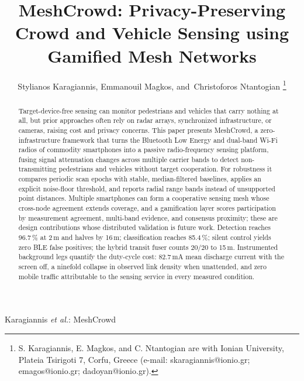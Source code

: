 \documentclass[journal,10pt]{IEEEtran}
\begin{document}
\title{MeshCrowd: Privacy-Preserving Crowd and Vehicle Sensing using Gamified Mesh Networks}

\author{Stylianos Karagiannis,
        Emmanouil Magkos,
        and~Christoforos Ntantogian%
\thanks{S. Karagiannis, E. Magkos, and C. Ntantogian are with Ionian
University, Plateia Tsirigoti 7, Corfu, Greece (e-mail:
skaragiannis@ionio.gr; emagos@ionio.gr; dadoyan@ionio.gr).}}

%
{Karagiannis \MakeLowercase{\textit{et al.}}: MeshCrowd}

\maketitle

\begin{abstract}
Target-device-free sensing can monitor pedestrians and vehicles that carry
nothing at all, but prior approaches often rely on radar arrays, synchronized
infrastructure, or cameras, raising cost and privacy concerns. This paper
presents MeshCrowd, a zero-infrastructure framework that turns the Bluetooth
Low Energy and dual-band Wi-Fi radios of commodity smartphones into a passive
radio-frequency sensing platform, fusing signal attenuation changes across
multiple carrier bands to detect non-transmitting pedestrians and vehicles
without target cooperation. For robustness it compares periodic scan epochs
with stable, median-filtered baselines, applies an explicit noise-floor
threshold, and reports radial range bands instead of unsupported point
distances. Multiple smartphones can form a cooperative sensing mesh whose
cross-node agreement extends coverage, and a gamification layer scores
participation by measurement agreement, multi-band evidence, and consensus
proximity; these are design contributions whose distributed validation is
future work. Detection reaches 96.7\,\% at 2\,m and halves by 16\,m;
classification reaches 85.4\,\%; silent control yields zero BLE false positives;
the hybrid transit fuser counts 20/20 to 15\,m. Instrumented background legs
quantify the duty-cycle cost: 82.7\,mA mean discharge current with the screen
off, a ninefold collapse in observed link density when unattended, and
zero mobile traffic attributable to the sensing service in every
measured condition.
\end{abstract}
\end{document}
